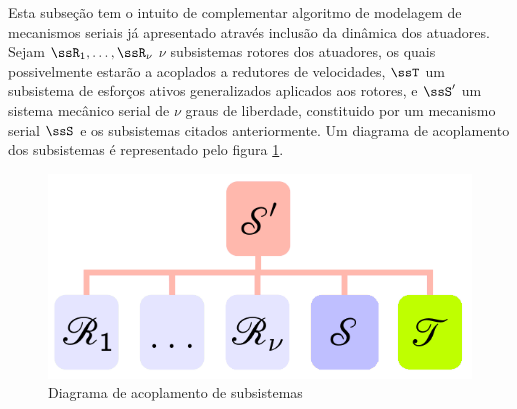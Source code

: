 \documentclass[]{politex}
\begin{document}
Esta subseção tem o intuito de complementar algoritmo de modelagem de mecanismos seriais já apresentado através inclusão da dinâmica dos atuadores. \\ 

Sejam $\ssR_1,\hdots,\ssR_\nu$ $\nu$ subsistemas rotores dos atuadores, os quais possivelmente estarão a acoplados a redutores de velocidades, $\ssT$ um subsistema de esforços ativos generalizados aplicados aos rotores,  e $\ssS'$ um sistema mecânico serial de $\nu$ graus de liberdade, constituido por um mecanismo serial $\ssS$ e os subsistemas citados anteriormente. Um diagrama de acoplamento dos subsistemas é representado pelo figura \ref{fig:AcoplamentoMecSerialRotores}.
\begin{figure}[h]
	\centering
	\includegraphics[scale=0.42]{imagens/DiagramaAcoplamentoMecSerialRotores.png}  
	\caption{Diagrama de acoplamento de subsistemas}
	\label{fig:AcoplamentoMecSerialRotores}
\end{figure}
\end{document}
